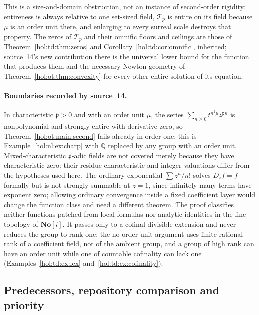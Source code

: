 \documentclass[11pt]{article}
\numberwithin{equation}{section}
\theoremstyle{definition}
\theoremstyle{remark}
\newcommand{\Q}{\mathbb Q}
\newcommand{\No}{\mathbf{No}}
\begin{document}
This is a size-and-domain obstruction, not an instance of second-order
rigidity: entireness is always relative to one set-sized field, $\mathcal T_p$
is entire on its field because $\mu$ is an order unit there, and enlarging to
every surreal scale destroys that property. The zeros of $\mathcal T_p$ and
their omnific floors and ceilings are those of Theorem~\ref{hol:td:thm:zeros}
and Corollary~\ref{hol:td:cor:omnific}, inherited; source~14's new contribution
there is the universal lower bound for the function that produces them and the
necessary Newton geometry of Theorem~\ref{hol:ot:thm:convexity} for every other
entire solution of its equation.

\paragraph{Boundaries recorded by source~14.}
In characteristic $\mathfrak p>0$ and with an order unit $\mu$, the series
$\sum_{n\ge0}t^{n^2\mu}z^{\mathfrak pn}$ is nonpolynomial and strongly entire with
derivative zero, so Theorem~\ref{hol:ot:main:second} fails already in order
one; this is Example~\ref{hol:nl:ex:charp} with $\Q$ replaced by any group with
an order unit. Mixed-characteristic $\mathfrak p$-adic fields are not covered merely
because they have characteristic zero: their residue characteristic and
integer valuations differ from the hypotheses used here. The ordinary
exponential $\sum z^n/n!$ solves $D_zf=f$ formally but is not strongly
summable at $z=1$, since infinitely many terms have exponent zero; allowing
ordinary convergence inside a fixed coefficient layer would change the
function class and need a different theorem. The proof classifies neither
functions patched from local formulas nor analytic identities in the fine
topology of $\No[i]$. It passes only to a cofinal divisible extension and never
reduces the group to rank one; the no-order-unit argument uses finite rational
rank of a coefficient field, not of the ambient group, and a group of high rank
can have an order unit while one of countable cofinality can lack one
(Examples~\ref{hol:td:ex:lex} and~\ref{hol:td:ex:cofinality}).

\subsection{Predecessors, repository comparison and priority}
\label{hol:ot:sub:predecessors}
\end{document}
